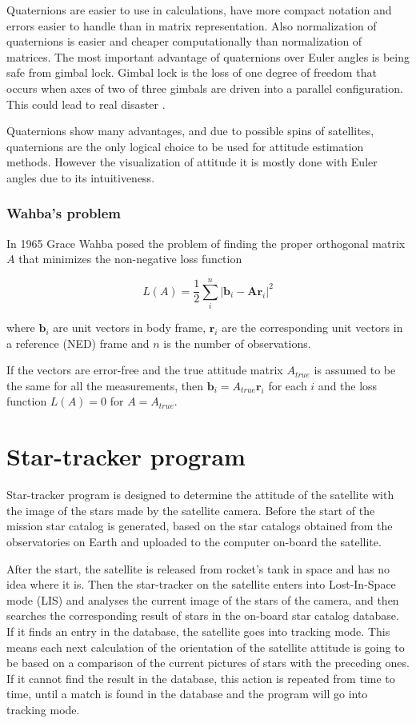 \documentclass[12pt,a4paper,twoside]{article}
\begin{document}
Quaternions are easier to use in calculations, have more compact notation and errors easier to handle than in matrix representation. Also normalization of quaternions is easier and cheaper computationally than normalization of matrices.
The most important advantage of quaternions over Euler angles is being safe from gimbal lock. Gimbal lock is the loss of one degree of freedom that occurs when axes of two of three gimbals are driven into a parallel configuration. This could lead to real disaster \citet{shoemake1985animating}.

Quaternions show many advantages, and due to possible spins of satellites, quaternions are the only logical choice to be used for attitude estimation methods. However the visualization of attitude it is mostly done with Euler angles due to its intuitiveness.

\subsubsection{Wahba's problem}


In 1965 Grace Wahba posed the problem of finding the proper orthogonal matrix $A$ that minimizes the non-negative loss function\cite{wahba1965least}

\begin{equation}
L(A) = \frac{1}{2} \sum_i^n|\bm{b}_i - \bm{Ar}_i|^2
\end{equation}

where $\bm{b}_i$ are unit vectors in body frame, $\bm{r}_i$ are the corresponding unit vectors in a reference (NED) frame and $n$ is the number of observations.

If the vectors are error-free and the true attitude matrix $A_{true}$ is assumed to be the same for all the measurements, then $\bm{b}_i = A_{true}\bm{r}_i$ for each $i$ and the loss function $L(A) = 0$ for $A = A_{true}$.


\newpage
\section{Star-tracker program}

Star-tracker program is designed to determine the attitude of the satellite with the image of the stars made by the satellite camera. Before the start of the mission star catalog is generated, based on the star catalogs obtained from the observatories on Earth and uploaded to the computer on-board the satellite. 

After the start, the satellite is released from rocket's tank in space and has no idea where it is. Then the star-tracker on the satellite enters into Lost-In-Space mode (LIS) and analyses the current image of the stars of the camera, and then searches the corresponding result of stars in the on-board star catalog database. If it finds an entry in the database, the satellite goes into tracking mode. This means each next calculation of the orientation of the satellite attitude is going to be based on a comparison of the current pictures of stars with the preceding ones. If it cannot find the result in the database, this action is repeated from time to time, until a match is found in the database and the program will go into tracking mode.
\end{document}
